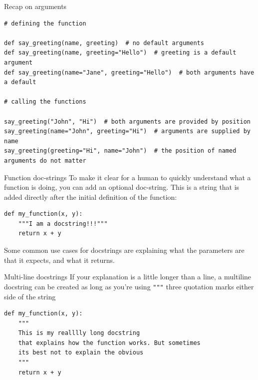 \documentclass[10pt]{beamer}
\begin{document}
\begin{frame}[label={sec:org9a0c21e},fragile]{Recap on arguments}
 \begin{verbatim}
# defining the function

def say_greeting(name, greeting)  # no default arguments
def say_greeting(name, greeting="Hello")  # greeting is a default argument
def say_greeting(name="Jane", greeting="Hello")  # both arguments have a default

# calling the functions

say_greeting("John", "Hi")  # both arguments are provided by position
say_greeting(name="John", greeting="Hi")  # arguments are supplied by name
say_greeting(greeting="Hi", name="John")  # the position of named arguments do not matter
\end{verbatim}
\end{frame}


\begin{frame}[label={sec:orgca9640a},fragile]{Function doc-strings}
 To make it clear for a human to quickly understand what a function is doing, you can
add an optional doc-string. This is a string that is added directly after the initial
definition of the function:

\begin{verbatim}
def my_function(x, y):
    """I am a docstring!!!"""
    return x + y
\end{verbatim}

Some common use cases for docstrings are explaining what the parameters are that it
expects, and what it returns.
\end{frame}

\begin{frame}[label={sec:orgd5861fe},fragile]{Multi-line docstrings}
 If your explanation is a little longer than a line, a multiline docstring can be
created as long as you're using \texttt{"""} three quotation marks either side of the string

\begin{verbatim}
def my_function(x, y):
    """
    This is my realllly long docstring
    that explains how the function works. But sometimes
    its best not to explain the obvious
    """
    return x + y
\end{verbatim}
\end{frame}
\end{document}
